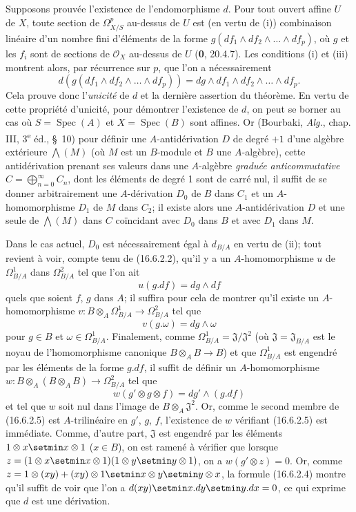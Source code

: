 Supposons prouvée l'existence de l'endomorphisme $d$. Pour tout ouvert affine
$U$ de $X$, toute section de $\varOmega_{X/S}^p$ au-dessus de $U$ est (en vertu
de (i)) combinaison linéaire d'un nombre fini d'éléments de la forme
$g(df_1\wedge df_2\wedge\ldots\wedge df_p)$, où $g$ et les $f_i$ sont de
sections de $\mathcal{O}_X$ au-dessus de $U$ (\textbf{0}, 20.4.7). Les conditions (i)
et (iii) montrent alors, par récurrence sur $p$, que l'on a nécessairement
\[
  d(g(df_1\wedge df_2\wedge\ldots\wedge df_p))
  =dg\wedge df_1\wedge df_2\wedge\ldots\wedge df_p.
  \tag{16.6.2.2}
  \label{IV.16.6.2.2}
\]
Cela prouve donc l'\emph{unicité} de $d$ et la dernière assertion du théorème.
En vertu de cette propriété d'unicité, pour démontrer l'existence de $d$, on
peut se borner au cas où $S=\operatorname{Spec}(A)$ et
$X=\operatorname{Spec}(B)$ sont affines. Or (Bourbaki, \emph{Alg.}, chap.
III, 3\textsuperscript{e} éd., \S~10) pour définir une $A$-antidérivation
$D$ de degré $+1$ d'une algèbre extérieure $\bigwedge(M)$ (où $M$ est un
$B$-module et $B$ une $A$-algèbre), cette antidérivation prenant ses valeurs
dans une $A$-algèbre \emph{graduée anticommutative}
$C=\bigoplus_{n=0}^{\infty}C_n$, dont les éléments de degré 1 sont de carré
nul, il suffit de se donner arbitrairement une $A$-dérivation $D_0$ de $B$
dans $C_1$ et un $A$-homomorphisme $D_1$ de $M$ dans $C_2$; il existe alors
une $A$-antidérivation $D$ et une seule de $\bigwedge(M)$ dans $C$
coïncidant avec $D_0$ dans $B$ et avec $D_1$ dans $M$.

Dans le cas actuel, $D_0$ est nécessairement égal à $d_{B/A}$ en vertu de
(ii); tout revient à voir, compte tenu de (16.6.2.2), qu'il y a un
$A$-homomorphisme $u$ de $\Omega_{B/A}^1$ dans $\Omega_{B/A}^2$ tel que
l'on ait
\[
  u(g.df)=dg\wedge df
  \tag{16.6.2.3}
  \label{IV.16.6.2.3}
\]
quels que soient $f$, $g$ dans $A$; il suffira pour cela de montrer qu'il
existe un $A$-homomorphisme
$v:B\otimes_A\Omega_{B/A}^1\to\Omega_{B/A}^2$ tel que
\[
  v(g.\omega)=dg\wedge\omega
  \tag{16.6.2.4}
  \label{IV.16.6.2.4}
\]
pour $g\in B$ et $\omega\in\Omega_{B/A}^1$. Finalement, comme
$\Omega_{B/A}^1=\mathfrak{J}/\mathfrak{J}^2$ (où
$\mathfrak{J}=\mathfrak{J}_{B/A}$ est le noyau de l'homomorphisme canonique
$B\otimes_A B\to B$) et que $\Omega_{B/A}^1$ est engendré par les éléments
de la forme $g.df$, il suffit de définir un $A$-homomorphisme
$w:B\otimes_A(B\otimes_A B)\to\Omega_{B/A}^2$ tel que
\[
  w(g'\otimes g\otimes f)=dg'\wedge(g.df)
  \tag{16.6.2.5}
  \label{IV.16.6.2.5}
\]
et tel que $w$ soit nul dans l'image de $B\otimes_A\mathfrak{J}^2$. Or,
comme le second membre de (16.6.2.5) est $A$-trilinéaire en $g'$, $g$, $f$,
l'existence de $w$ vérifiant (16.6.2.5) est immédiate. Comme, d'autre part,
$\mathfrak{J}$ est engendré par les éléments $1\otimes x\setmin x\otimes1$
($x\in B$), on est ramené à vérifier que lorsque
$z=(1\otimes x\setmin x\otimes1)(1\otimes y\setmin y\otimes1)$, on a
$w(g'\otimes z)=0$. Or, comme
$z=1\otimes(xy)+(xy)\otimes1\setmin x\otimes y\setmin y\otimes x$, la formule (16.6.2.4)
montre qu'il
suffit de voir que l'on a $d(xy)\setmin x.dy\setmin y.dx=0$, ce qui exprime que $d$ est une
dérivation.

